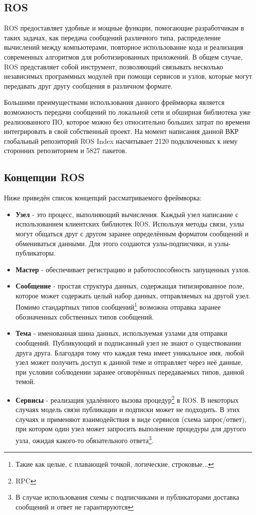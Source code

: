 \subsection{ROS}
ROS предоставляет удобные и мощные функции, помогающие разработчикам в таких задачах, как передача сообщений различного типа, распределение вычислений между компьютерами, повторное использование кода и реализация современных алгоритмов для роботизированных приложений. В общем случае, ROS представляет собой инструмент, позволяющий связывать несколько независимых программных модулей при помощи сервисов и узлов, которые могут передавать друг другу сообщения в различном формате.

Большими преимуществами использования данного фреймворка является возможность передачи сообщений по локальной сети и обширная библиотека уже реализованного ПО, которое можно без относительно больших затрат по времени интегрировать в свой собственный проект. На момент написания данной ВКР глобальный репозиторий ROS Index насчитывает 2120 подключенных к нему сторонних репозиторием и 5827 пакетов.

\subsection{Концепции ROS}
Ниже приведён список концепций рассматриваемого фреймворка:
\begin{itemize}
\item {\textbf{Узел} - это процесс, выполняющий вычисления. Каждый узел написание с использованием клиентских библиотек ROS. Используя методы связи, узлы могут общаться друг с другом заранее определённым форматом сообщений и обмениваться данными. Для этого создаются узлы-подписчики, и узлы-публикаторы.}
\item {\textbf{Мастер} - обеспечивает регистрацию и работоспособность запущенных узлов.}
\item {\textbf{Сообщение} - простая структура данных, содержащая типизированное поле, которое может содержать целый набор данных, отправляемых на другой узел. Помимо стандартных типов сообщений\footnote{Такие как целые, с плавающей точкой, логические, строковые...} возможна отправка заранее обозначенных собственных типов сообщений.}
\item {\textbf{Тема} - именованная шина данных, используемая узлами для отправки сообщений. Публикующий и подписанный узел не знают о существовании друга друга. Благодаря тому что каждая тема имеет уникальное имя, любой узел может получить доступ к данной теме и отправляет через неё данные, при условии соблюдении заранее оговорённых передаваемых типов, данной темой.}
\item {\textbf{Сервисы} - реализация удалённого вызова процедур\footnote{RPC} в ROS. В некоторых случаях модель связи публикации и подписки может не подходить. В этих случаях и применяют взаимодействия в виде сервисов (схема запрос/ответ), при котором один узел может запросить выполнение процедуры для другого узла, ожидая какого-то обязательного ответа\footnote{В случае использования схемы с подписчиками и публикаторами доставка сообщений и ответ не гарантируются}.}
\end{itemize}

